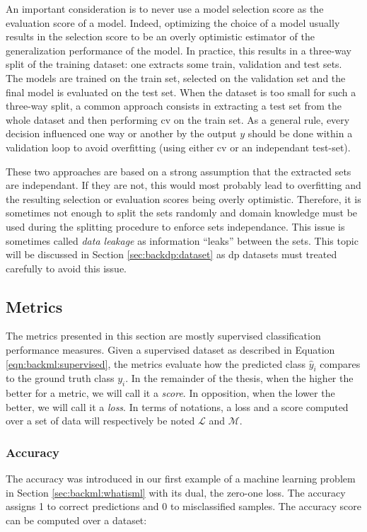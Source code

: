 An important consideration is to never use a model selection score as the evaluation
score of a model. Indeed, optimizing the choice of a model usually results in the
selection score to be an overly optimistic estimator of the generalization
performance of the model. In practice, this results in a three-way split of the
training dataset: one extracts some train, validation and test sets. The models
are trained on the train set, selected on the validation set and the final model is evaluated
on the test set. When the dataset is too small for such a three-way split, a common
approach consists in extracting a test set from the whole dataset and then
performing \acrlong{cv} on the train set. As a general rule, every decision
influenced one way or another by the output $y$ should be done within a validation
loop to avoid overfitting (using either \acrlong{cv} or an independant
test-set).

These two approaches are based on a strong assumption that the extracted sets are
independant. If they are not, this would most probably lead to overfitting and
the resulting selection or evaluation scores being overly optimistic. Therefore,
it is sometimes not enough to split the sets randomly and domain knowledge must
be used during the splitting procedure to enforce sets independance. This issue
is sometimes called \textit{data leakage} \parencite{kaufman2012leakage} as
information ``leaks'' between the sets. This topic will be discussed in Section
\ref{sec:backdp:dataset} as \acrlong{dp} datasets must treated carefully to avoid
this issue.

\subsection{Metrics}
\label{ssec:backml:metrics}

The metrics presented in this section are mostly supervised classification
performance measures. Given a supervised dataset as described in Equation
\ref{eqn:backml:supervised}, the metrics evaluate how the predicted class $\hat{y}_i$
compares to the ground truth class $y_i$. In the remainder of the thesis, when
the higher the better for a metric, we will call it a \textit{score}. In opposition,
when the lower the better, we will call it a \textit{loss}. In terms of notations,
a loss and a score computed over a set of data will respectively be noted
$\mathcal{L}$ and $\mathcal{M}$.

\subsubsection{Accuracy}
\label{sssec:backml:metric:acc}
The accuracy was introduced in our first example of a machine learning problem in
Section \ref{sec:backml:whatisml} with its dual, the zero-one loss. The accuracy
assigns 1 to correct predictions and 0 to misclassified samples. The accuracy
score can be computed over a dataset:

